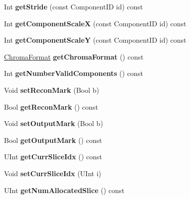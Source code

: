 \begin{DoxyCompactItemize}
Int {\bfseries get\+Stride} (const Component\+ID id) const
\item 
\mbox{\label{class_t_com_pic_ac4112db5dbee1cd83046e30ce5042145}} 
Int {\bfseries get\+Component\+ScaleX} (const Component\+ID id) const
\item 
\mbox{\label{class_t_com_pic_a3f81abd8fd43c6f9f2e75ff4a4408668}} 
Int {\bfseries get\+Component\+ScaleY} (const Component\+ID id) const
\item 
\mbox{\label{class_t_com_pic_ac202ace36bc9494e57efc0488e47f4b3}} 
\hyperlink{_type_def_8h_a4a6c51c10f2eb04abc7209db7caff39f}{Chroma\+Format} {\bfseries get\+Chroma\+Format} () const
\item 
\mbox{\label{class_t_com_pic_aa34ed1d3329104bd2612f326f4c0be85}} 
Int {\bfseries get\+Number\+Valid\+Components} () const
\item 
\mbox{\label{class_t_com_pic_ad4f27a7d8ed12527e45ef670b342dc2d}} 
Void {\bfseries set\+Recon\+Mark} (Bool b)
\item 
\mbox{\label{class_t_com_pic_a6a81b6867ccfbf102a431a3869ff3281}} 
Bool {\bfseries get\+Recon\+Mark} () const
\item 
\mbox{\label{class_t_com_pic_a8603217bc9a69b6f2c596efb4d371b5c}} 
Void {\bfseries set\+Output\+Mark} (Bool b)
\item 
\mbox{\label{class_t_com_pic_a6fc31a14ea94bc4ec57f5f079cb2b615}} 
Bool {\bfseries get\+Output\+Mark} () const
\item 
\mbox{\label{class_t_com_pic_a162588f8bd80af59c81979af33d74c50}} 
U\+Int {\bfseries get\+Curr\+Slice\+Idx} () const
\item 
\mbox{\label{class_t_com_pic_a034b753f77683a705d4039359733cce8}} 
Void {\bfseries set\+Curr\+Slice\+Idx} (U\+Int i)
\item 
\mbox{\label{class_t_com_pic_a6e7397c0cc941e4f1ad51181449fcfa8}} 
U\+Int {\bfseries get\+Num\+Allocated\+Slice} () const

\end{DoxyCompactItemize}

